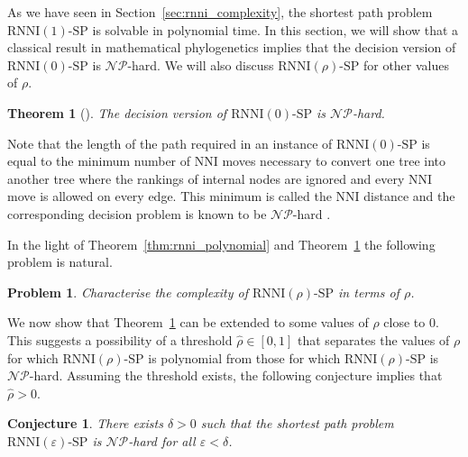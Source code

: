 \documentclass[11pt]{amsart}
\newtheorem{theorem}{Theorem}
\newtheorem{problem}{Problem}
\newtheorem{conjecture}{Conjecture}
\newcommand{\rnni}{\mathrm{RNNI}}
\newcommand{\nni}{\mathrm{NNI}}
\newcommand{\np}{\mathcal{NP}}
\newcommand{\p}{\mathcal{P}}
\newcommand{\decprob}[1]{\rnni(#1)\text{-}\mathrm{SP}}
\renewcommand{\epsilon}{\varepsilon}
\newcommand{\summary}[1]{} %
\begin{document}
\summary{Summarising results on complexity of $\decprob{\rho}$ -- $\decprob{1} \in \p$ and $\decprob{0} \in \np$}
As we have seen in Section~\ref{sec:rnni_complexity}, the shortest path problem $\decprob{1}$ is solvable in polynomial time.
In this section, we will show that a classical result in mathematical phylogenetics implies that the decision version of $\decprob{0}$ is $\np$-hard.
We will also discuss $\decprob{\rho}$ for other values of $\rho$.

\begin{theorem}[\textcite{Dasgupta2000-xa}]
The decision version of $\decprob{0}$ is $\np$-hard.
\label{thm:nni_hard}
\end{theorem}

\proof
Note that the length of the path required in an instance of $\decprob{0}$ is equal to the minimum number of $\nni$ moves necessary to convert one tree into another tree where the rankings of internal nodes are ignored and every $\nni$ move is allowed on every edge.
This minimum is called the $\nni$ distance and the corresponding decision problem is known to be $\np$-hard \autocite{Dasgupta2000-xa}.
\endproof

\summary{Complexity of $\decprob{\rho}$ changes somewhere between zero and one -- where remains an open question}
In the light of Theorem~\ref{thm:rnni_polynomial} and Theorem~\ref{thm:nni_hard} the following problem is natural.

\begin{problem}
Characterise the complexity of $\decprob{\rho}$ in terms of $\rho$.
\label{prblm:rho_range}
\end{problem}

\summary{Getting one step closer to answer this question by considering small neighbourhoods for $\rho$ around zero and one}
We now show that Theorem~\ref{thm:nni_hard} can be extended to some values of $\rho$ close to $0$.
This suggests a possibility of a threshold $\hat\rho \in [0, 1]$ that separates the values of $\rho$ for which $\decprob{\rho}$ is polynomial from those for which $\decprob{\rho}$ is $\np$-hard.
Assuming the threshold exists, the following conjecture implies that $\hat\rho > 0$.

\begin{conjecture}
There exists $\delta > 0$ such that the shortest path problem $\decprob{\epsilon}$ is $\np$-hard for all $\epsilon < \delta$.
\label{prop:complexity_around_nni}
\end{conjecture}
\end{document}
